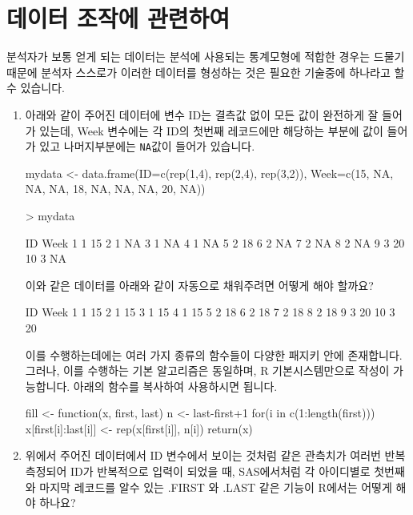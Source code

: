 \documentclass{article}
\begin{document}
\section{데이터 조작에 관련하여}

분석자가 보통 얻게 되는 데이터는 분석에 사용되는 통계모형에 적합한 경우는 드물기 때문에 분석자 스스로가 이러한 데이터를 형성하는 것은 필요한 기술중에 하나라고 할 수 있습니다.
% 

\begin{enumerate}
\item 아래와 같이 주어진 데이터에 변수 ID는 결측값 없이 모든 값이 완전하게 잘 들어가 있는데, Week 변수에는 각 ID의 첫번째 레코드에만 해당하는 부분에 값이 들어가 있고 나머지부분에는 \texttt{NA}값이 들어가 있습니다. 

\begin{Schunk}
\begin{Soutput}
mydata <- data.frame(ID=c(rep(1,4), rep(2,4), rep(3,2)), Week=c(15, NA, NA, NA, 18, NA, NA, NA, 20, NA))

> mydata		

   ID Week
1   1   15
2   1   NA
3   1   NA
4   1   NA
5   2   18
6   2   NA
7   2   NA
8   2   NA
9   3   20
10  3   NA
\end{Soutput}
\end{Schunk}

이와 같은 데이터를 아래와 같이 자동으로 채워주려면 어떻게 해야 할까요? 	
	
\begin{Schunk}
\begin{Soutput}
   ID Week
1   1   15
2   1   15
3   1   15
4   1   15
5   2   18
6   2   18
7   2   18
8   2   18
9   3   20
10  3   20
\end{Soutput}
\end{Schunk}
	

이를 수행하는데에는 여러 가지 종류의 함수들이 다양한 패지키 안에 존재합니다.  
그러나, 이를 수행하는 기본 알고리즘은 동일하며, R 기본시스템만으로 작성이 가능합니다. 
아래의 함수를 복사하여 사용하시면 됩니다. 

\begin{Schunk}
	\begin{Soutput}
fill <- function(x, first, last){
	n <- last-first+1
	for(i in c(1:length(first))) x[first[i]:last[i]] <- rep(x[first[i]], n[i])
	return(x)
}
	\end{Soutput}
\end{Schunk}


\item 위에서 주어진 데이터에서 ID 변수에서 보이는 것처럼 같은 관측치가 여러번 반복 측정되어 ID가 반복적으로 입력이 되었을 때, SAS에서처럼 각 아이디별로 첫번째와 마지막 레코드를 알수 있는 .FIRST 와 .LAST 같은 기능이 R에서는 어떻게 해야 하나요?


\end{enumerate}
\end{document}
